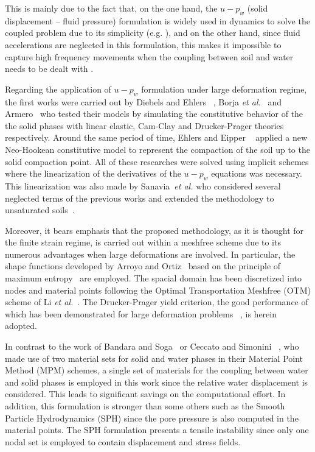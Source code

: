 \documentclass[twocolumn]{svjour3}          %
\begin{document}
{\color{red}
This is mainly due to the fact that, on the one hand, the $u-p_w$ (solid displacement -- fluid pressure) formulation is widely used in dynamics to solve the coupled problem due to its simplicity (e.g. \cite{CaoSanavia:16,zienkiewicz1990a,Zienkiewicz99}), and on the other hand, since fluid accelerations are neglected in this formulation, this makes it impossible to capture high frequency movements when the coupling between soil and water needs to be dealt with \cite{zienkiewicz1980}.

Regarding the application of $u-p_w$ formulation under large deformation regime, the first works were  carried out by Diebels and Ehlers ~\cite{DiebelsE:96}, Borja \textit{et al.}~\cite{borja95,borja98} and Armero~\cite{Armero99} who tested their models by simulating the constitutive behavior of the the solid phases with linear elastic, Cam-Clay and Drucker-Prager theories respectively.  Around the same period of time, Ehlers and Eipper ~\cite{Ehlers:99} applied a new Neo-Hookean constitutive model to represent the compaction of the soil up to the solid compaction point. All of these researches were solved using implicit schemes where the linearization of the derivatives of the $u-p_w$ equations was necessary. This linearization was also made by Sanavia~\textit{et al.}\cite{Sanavia:01} who considered several neglected terms of the previous works and extended the methodology to unsaturated soils~\cite{Sanavia:02}.

Moreover, it bears emphasis that the proposed methodology, as it is thought for the finite strain regime, is carried out within a meshfree scheme due to its numerous advantages when large deformations are involved. In particular,  the shape functions developed by Arroyo and Ortiz~\cite{arroyo2006} based on the principle of maximum entropy~\cite{Sukumar2004} are employed.  The  spacial domain has been discretized into nodes and material points following the Optimal Transportation Meshfree (OTM) scheme of Li {\it et al.}~\cite{li2010}. The Drucker-Prager yield criterion, the good performance of which has been demonstrated for large deformation problems ~\cite{Navas2018}, is herein adopted.

In contrast to the work of Bandara and Soga~\cite{Bandara2016a} or Ceccato and Simonini ~\cite{Ceccato:16}, who made use of two material sets for solid and water phases in their Material Point Method (MPM) schemes, a single set of materials for the coupling between water and solid phases is employed in this work since the relative water displacement  is considered. This leads to significant savings on the computational effort. In addition, this formulation is stronger than some others such as the Smooth Particle Hydrodynamics (SPH) since the pore pressure is also computed in the material points. The  SPH formulation presents a tensile instability since only one nodal set is employed to contain displacement and stress fields.
 }
 
\end{document}
